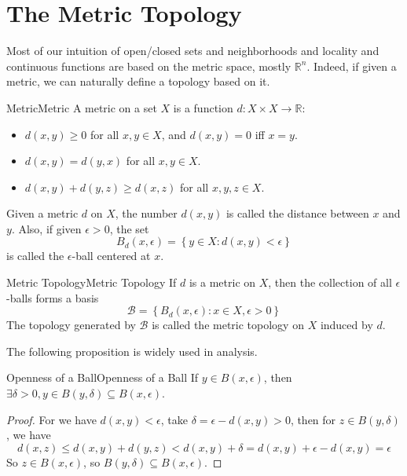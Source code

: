 \documentclass[../main.tex]{subfiles}
\begin{document}
\section{The Metric Topology}

Most of our intuition of open/closed sets and neighborhoods and locality and continuous functions are based on the metric space, mostly $\mathbb{R}^n$. Indeed, if given a metric, we can naturally define a topology based on it.

\begin{definition}{Metric}{Metric}
A metric on a set $X$ is a function $d: X \times X \rightarrow \mathbb{R}$:
\begin{itemize}
\item $d(x,y) \geq 0$ for all $x,y\in X$, and $d(x,y) = 0$ iff $x=y$.
\item $d(x,y) = d(y,x)$ for all $x,y\in X$.
\item $d(x,y) + d(y,z) \geq d(x,z)$ for all $x,y,z\in X$.
\end{itemize}
\end{definition}

Given a metric $d$ on $X$, the number $d(x,y)$ is called the distance between $x$ and $y$. Also, if given $\epsilon>0$, the set
\begin{equation*}
	B_d(x,\epsilon) = \left\{ y\in X : d(x,y) < \epsilon \right\}
\end{equation*}
is called the $\epsilon$-ball centered at $x$.

\begin{definition}{Metric Topology}{Metric Topology}
If $d$ is a metric on $X$, then the collection of all $\epsilon$-balls forms a basis
\begin{equation*}
\mathcal{B} = \left\{ B_d(x,\epsilon): x\in X, \epsilon>0 \right\}
\end{equation*}
The topology generated by $\mathcal{B}$ is called the metric topology on $X$ induced by $d$.
\end{definition}

The following proposition is widely used in analysis.
\begin{proposition}{Openness of a Ball}{Openness of a Ball}
If $y\in B(x,\epsilon)$, then $\exists \delta>0, y\in B(y,\delta) \subseteq B(x,\epsilon)$.

\begin{proof}
For we have $d(x,y)<\epsilon$, take $\delta = \epsilon - d(x,y) > 0$, then for $z\in B(y,\delta)$, we have
\begin{equation*}
d(x,z) \leq d(x,y) + d(y,z) < d(x,y) + \delta = d(x,y) + \epsilon - d(x,y) = \epsilon
\end{equation*}
So $z\in B(x,\epsilon)$, so $B(y,\delta) \subseteq B(x,\epsilon)$.
\end{proof}
\end{proposition}
\end{document}
